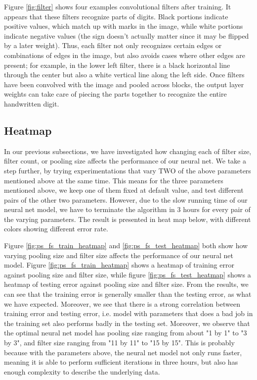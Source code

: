 \documentclass[10pt,twocolumn]{article}
\begin{document}
Figure \ref{fig:filter} shows four examples convolutional filters after training. It appears that these filters recognize parts of digits. Black portions indicate positive values, which match up with marks in the image, while white portions indicate negative values (the sign doesn't actually matter since it may be flipped by a later weight). Thus, each filter not only recognizes certain edges or combinations of edges in the image, but also avoids cases where other edges are present; for example, in the lower left filter, there is a black horizontal line through the center but also a white vertical line along the left side. Once filters have been convolved with the image and pooled across blocks, the output layer weights can take care of piecing the parts together to recognize the entire handwritten digit.

\subsection{Heatmap}

In our previous subsections, we have investigated how changing each of filter size, filter count, or pooling size affects the performance of our neural net. We take a step further, by trying experimentations that vary TWO of the above parameters mentioned above at the same time. This means for the three parameters mentioned above, we keep one of them fixed at default value, and test different pairs of the other two parameters. However, due to the slow running time of our neural net model, we have to terminate the algorithm in 3 hours for every pair of the varying parameters. The result is presented in heat map below, with different colors showing different error rate.

Figure \ref{fig:ps_fs_train_heatmap} and \ref{fig:ps_fs_test_heatmap} both show how varying pooling size and filter size affects the performance of our neural net model. Figure \ref{fig:ps_fs_train_heatmap} shows a heatmap of training error against pooling size and filter size, while figure \ref{fig:ps_fs_test_heatmap} shows a heatmap of testing error against pooling size and filter size. From the results, we can see that the training error is generally smaller than the testing error, as what we have expected. Moreover, we see that there is a strong correlation between training error and testing error, i.e. model with parameters that does a bad job in the training set also performs badly in the testing set. Moreover, we observe that the optimal neural net model has pooling size ranging from about "1 by 1" to "3 by 3", and filter size ranging from "11 by 11" to "15 by 15". This is probably because with the parameters above, the neural net model not only runs faster, meaning it is able to perform sufficient iterations in three hours, but also has enough complexity to describe the underlying data.
\end{document}
